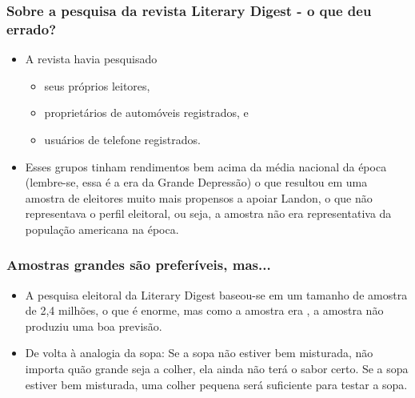 
\begin{frame}
\frametitle{Sobre a pesquisa da revista Literary Digest - o que deu errado?}

\begin{itemize}

\item A revista havia pesquisado

\begin{itemize}

\item seus próprios leitores,

\item proprietários de automóveis registrados, e

\item usuários de telefone registrados.

\end{itemize}
\justifying
\item Esses grupos tinham rendimentos bem acima da média nacional da época (lembre-se, essa é a era da Grande Depressão) o que resultou em uma amostra de eleitores muito mais propensos a apoiar Landon, o que não representava o perfil eleitoral, ou seja, a amostra não era representativa da população americana na época.

\end{itemize}

\end{frame}


\begin{frame}
\frametitle{Amostras grandes são preferíveis, mas...}

\begin{itemize}
\justifying
\item A pesquisa eleitoral da Literary Digest  baseou-se em um tamanho de amostra de 2,4 milhões, o que é enorme, mas como a amostra era , a amostra não produziu uma boa previsão.
\justifying
\item De volta à analogia da sopa: Se a sopa não estiver bem misturada, não importa quão grande seja a colher, ela ainda não terá o sabor certo. Se a sopa estiver bem misturada, uma colher pequena será suficiente para testar a sopa.

\end{itemize}

\end{frame}

